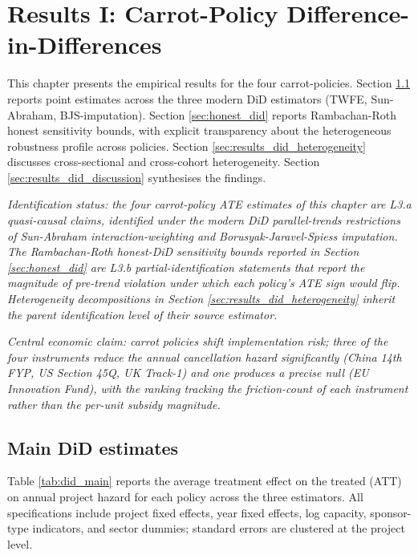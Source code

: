 \chapter{Results I: Carrot-Policy Difference-in-Differences}
\label{ch:results_did}

This chapter presents the empirical results for the four carrot-policies. Section \ref{sec:results_did_main} reports point estimates across the three modern DiD estimators (TWFE, Sun-Abraham, BJS-imputation). Section \ref{sec:honest_did} reports Rambachan-Roth honest sensitivity bounds, with explicit transparency about the heterogeneous robustness profile across policies. Section \ref{sec:results_did_heterogeneity} discusses cross-sectional and cross-cohort heterogeneity. Section \ref{sec:results_did_discussion} synthesises the findings.

\noindent\emph{Identification status: the four carrot-policy ATE estimates of this chapter are L3.a quasi-causal claims, identified under the modern DiD parallel-trends restrictions of Sun-Abraham interaction-weighting and Borusyak-Jaravel-Spiess imputation. The Rambachan-Roth honest-DiD sensitivity bounds reported in Section \ref{sec:honest_did} are L3.b partial-identification statements that report the magnitude of pre-trend violation under which each policy's ATE sign would flip. Heterogeneity decompositions in Section \ref{sec:results_did_heterogeneity} inherit the parent identification level of their source estimator.}

\noindent\emph{Central economic claim: carrot policies shift implementation risk; three of the four instruments reduce the annual cancellation hazard significantly (China 14th FYP, US Section 45Q, UK Track-1) and one produces a precise null (EU Innovation Fund), with the ranking tracking the friction-count of each instrument rather than the per-unit subsidy magnitude.}

\section{Main DiD estimates}
\label{sec:results_did_main}

Table \ref{tab:did_main} reports the average treatment effect on the treated (ATT) on annual project hazard for each policy across the three estimators. All specifications include project fixed effects, year fixed effects, log capacity, sponsor-type indicators, and sector dummies; standard errors are clustered at the project level.

